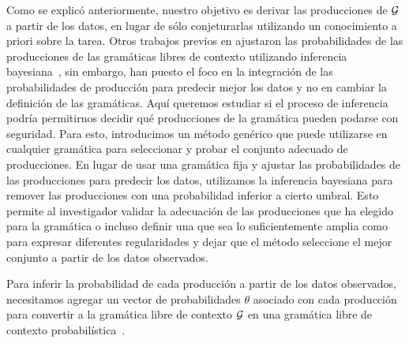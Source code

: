 Como se explicó anteriormente, nuestro objetivo es derivar las producciones de $\gram$ a partir de los datos, en lugar de sólo conjeturarlas utilizando un conocimiento a priori sobre la tarea. Otros trabajos previos en \lot ajustaron las probabilidades de las producciones de las gramáticas libres de contexto utilizando inferencia bayesiana~\cite{piantadosi2016logical}, sin embargo, han puesto el foco en la integración de las probabilidades de producción para predecir mejor los datos y no en cambiar la definición de las gramáticas. Aquí queremos estudiar si el proceso de inferencia podría permitirnos decidir qué producciones de la gramática pueden podarse con seguridad. Para esto, introducimos un método genérico que puede utilizarse en cualquier gramática para seleccionar y probar el conjunto adecuado de producciones. En lugar de usar una gramática fija y ajustar las probabilidades de las producciones para predecir los datos, utilizamos la inferencia bayesiana para remover las producciones con una probabilidad inferior a cierto umbral. Esto permite al investigador validar la adecuación de las producciones que ha elegido para la gramática o incluso definir una que sea lo suficientemente amplia como para expresar diferentes regularidades y dejar que el método seleccione el mejor conjunto a partir de los datos observados.   



Para inferir la probabilidad de cada producción a partir de los datos observados, necesitamos agregar un vector de probabilidades $\theta$ asociado con cada producción para convertir a la gramática libre de contexto $\gram$ en una gramática libre de contexto probabilística~\cite{manning1999foundations}.


